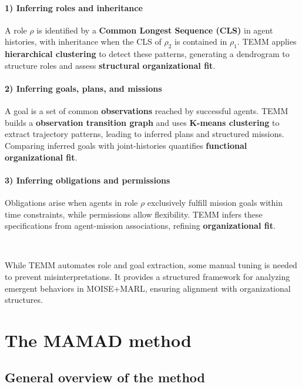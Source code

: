\documentclass[pdflatex,sn-mathphys-num]{sn-jnl}%
\theoremstyle{thmstyleone}%
\theoremstyle{thmstyletwo}%
\theoremstyle{thmstylethree}%
\begin{document}
\paragraph{\textbf{1) Inferring roles and inheritance}}
A role $\rho$ is identified by a \textbf{Common Longest Sequence (CLS)} in agent histories, with inheritance when the CLS of $\rho_2$ is contained in $\rho_1$. TEMM applies \textbf{hierarchical clustering} to detect these patterns, generating a dendrogram to structure roles and assess \textbf{structural organizational fit}.

\paragraph{\textbf{2) Inferring goals, plans, and missions}}
A goal is a set of common \textbf{observations} reached by successful agents. TEMM builds a \textbf{observation transition graph} and uses \textbf{K-means clustering} to extract trajectory patterns, leading to inferred plans and structured missions. Comparing inferred goals with joint-histories quantifies \textbf{functional organizational fit}.

\paragraph{\textbf{3) Inferring obligations and permissions}}
Obligations arise when agents in role $\rho$ exclusively fulfill mission goals within time constraints, while permissions allow flexibility. TEMM infers these specifications from agent-mission associations, refining \textbf{organizational fit}.

\

While TEMM automates role and goal extraction, some manual tuning is needed to prevent misinterpretations. It provides a structured framework for analyzing emergent behaviors in MOISE+MARL, ensuring alignment with organizational structures.

\clearpage

\section{The MAMAD method}\label{sec:mamad}



\subsection{General overview of the method}
\end{document}
